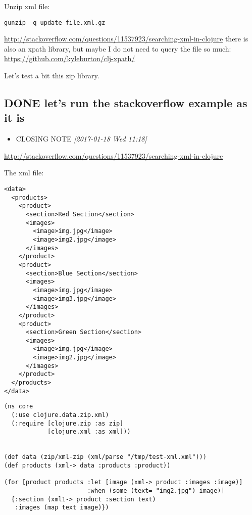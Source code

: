 \documentclass[11pt]{article}
\begin{document}
Unzip xml file:
\begin{verbatim}
gunzip -q update-file.xml.gz
\end{verbatim}


\url{http://stackoverflow.com/questions/11537923/searching-xml-in-clojure}
there is also an xpath library, but maybe I do not need to query the
file so much: \url{https://github.com/kyleburton/clj-xpath/}

Let's test a bit this zip library.

\subsection{{\bfseries\sffamily DONE} let's run the stackoverflow example as it is}
\label{sec:org9ffc6d2}
\begin{itemize}
\item CLOSING NOTE \textit{[2017-01-18 Wed 11:18]}
\end{itemize}
\url{http://stackoverflow.com/questions/11537923/searching-xml-in-clojure}

The xml file:

\begin{verbatim}
<data>
  <products>
    <product>
      <section>Red Section</section>
      <images>
        <image>img.jpg</image>
        <image>img2.jpg</image>
      </images>
    </product>
    <product>
      <section>Blue Section</section>
      <images>
        <image>img.jpg</image>
        <image>img3.jpg</image>
      </images>
    </product>
    <product>
      <section>Green Section</section>
      <images>
        <image>img.jpg</image>
        <image>img2.jpg</image>
      </images>
    </product>
  </products>
</data>
\end{verbatim}

\begin{verbatim}
(ns core
  (:use clojure.data.zip.xml)
  (:require [clojure.zip :as zip]
            [clojure.xml :as xml]))


(def data (zip/xml-zip (xml/parse "/tmp/test-xml.xml")))
(def products (xml-> data :products :product))

(for [product products :let [image (xml-> product :images :image)]
                       :when (some (text= "img2.jpg") image)]
  {:section (xml1-> product :section text)
   :images (map text image)})
\end{verbatim}
\end{document}
